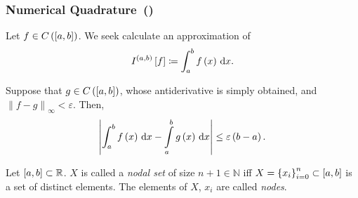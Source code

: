 \begin{frame}
    \frametitle{
        Numerical Quadrature~(\citeauthor[p.~397]{salgado_classical_2022})
    } %

    Let
    \begin{math}
        f\in
        C\left(\left[a,b\right]\right)
    \end{math}.
    We seek calculate an approximation of
    \begin{equation*}
        I^{\openinterval}
        \left[
            f
            \right]\coloneqq
        \int_{a}^{b}
        f\left(x\right)
        \dl x.
    \end{equation*}

    Suppose that
    \begin{math}
        g\in
        C\left(\left[a,b\right]\right)
    \end{math},
    whose antiderivative is simply obtained, and
    \begin{math}
        {\left\|f-g\right\|}_{\infty}<
        \varepsilon
    \end{math}.
    Then,
    \begin{equation*}
        \left|
        \int_{a}^{b}
        f\left(x\right)
        \dl x-
        \int\limits_{a}^{b}
        g\left(x\right)
        \dl x
        \right|\leq
        \varepsilon
        \left(b-a\right).
    \end{equation*}

    \begin{definition}
        Let
        \begin{math}
            \left[a,b\right]\subset
            \mathbb{R}
        \end{math}.
        $X$ is called a \emph{nodal set} of size $n+1\in\mathbb{N}$
        iff
        \begin{math}
            X={\left\{x_{i}\right\}}_{i=0}^{n}\subset
            \left[a,b\right]
        \end{math}
        is a set of distinct elements.
        The elements of $X$, $x_{i}$ are called \emph{nodes}.
    \end{definition}


\end{frame}
